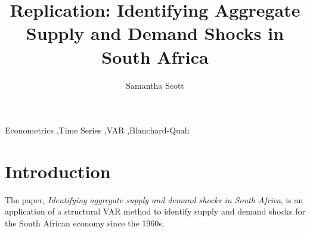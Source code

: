 \documentclass[11pt,preprint, authoryear]{elsarticle}
\numberwithin{equation}{section}
\numberwithin{figure}{section}
\numberwithin{table}{section}
\begin{document}
\begin{frontmatter}  %

\title{Replication: Identifying Aggregate Supply and Demand Shocks in
South Africa}





\author[Add1]{Samantha Scott}





\address[Add1]{Stellenbosch University, Cape Town, South Africa}



\vspace{1cm}


\begin{keyword}
\footnotesize{
Econometrics \sep Time Series \sep VAR \sep Blanchard-Quah \\
\vspace{0.3cm}
}
\end{keyword}



\vspace{0.5cm}

\end{frontmatter}



\pagestyle{fancy}
\chead{}
\rhead{}
\lfoot{}
\lhead{}
\cfoot{}


\headsep 35pt %




\hypertarget{introduction}{%
\section{Introduction}\label{introduction}}

The paper, \emph{Identifying aggregate supply and demand shocks in South
Africa}, is an application of a structural VAR method to identify supply
and demand shocks for the South African economy since the 1960s.
\end{document}
